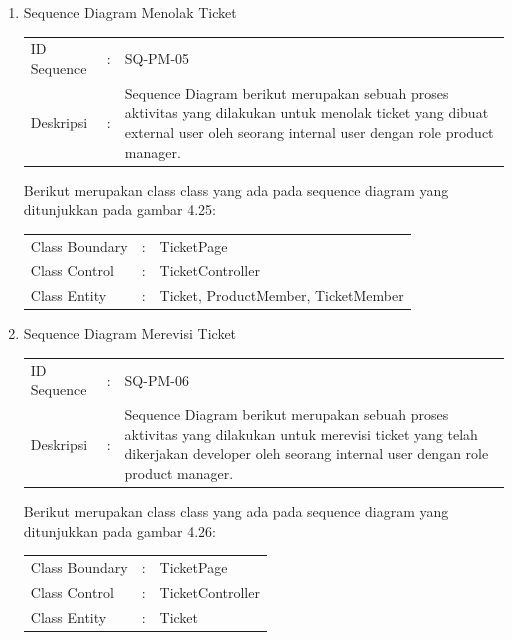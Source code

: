 \documentclass[12pt]{article}
\begin{document}
\begin{enumerate}[label=\textbf{4.\arabic*.}]
\begin{enumerate} [label=\textbf{4.2.\arabic*.}, wide, labelwidth=!, labelindent=0pt]
\begin{enumerate}[label=\textbf{4.2.2.\arabic*.}, wide, labelwidth=!, labelindent=0pt]
\begin{enumerate}[label=\arabic*.]
\begin{tabularx}{.9\linewidth}{@{} l l X @{}}
                \end{tabularx}
                
                \item Sequence Diagram Menolak Ticket
                
                \begin{tabularx}{.9\linewidth}{@{} l l X @{}}
                    ID Sequence &	: & SQ-PM-05 \\
                    Deskripsi &	: & Sequence Diagram berikut merupakan sebuah proses aktivitas yang dilakukan untuk menolak ticket yang dibuat external user oleh seorang internal user dengan role product manager. 
        
                \end{tabularx}

                \noindent Berikut merupakan class class yang ada pada sequence diagram yang ditunjukkan pada gambar 4.25:

                \begin{tabularx}{.9\linewidth}{@{} l l X @{}}
                    Class Boundary & : & TicketPage \\
                    Class Control & : & TicketController \\
                    Class Entity & : & Ticket, ProductMember, TicketMember  
                
                \end{tabularx}

                \item Sequence Diagram Merevisi Ticket
                
                \begin{tabularx}{.9\linewidth}{@{} l l X @{}}
                    ID Sequence &	: & SQ-PM-06 \\
                    Deskripsi &	: & Sequence Diagram berikut merupakan sebuah proses aktivitas yang dilakukan untuk merevisi ticket yang telah dikerjakan developer oleh seorang internal user dengan role product manager. 
        
                \end{tabularx}

                \noindent Berikut merupakan class class yang ada pada sequence diagram yang ditunjukkan pada gambar 4.26:

                \begin{tabularx}{.9\linewidth}{@{} l l X @{}}
                    Class Boundary & : & TicketPage \\
                    Class Control & : & TicketController \\
                    Class Entity & : & Ticket
                

\end{tabularx}
\end{enumerate}
\end{enumerate}
\end{enumerate}
\end{enumerate}
\end{document}
